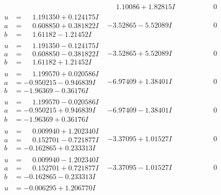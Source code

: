 \documentclass[1p]{elsarticle_modified}
\theoremstyle{definition}
\begin{document}
$$\begin{array}{c|c|c}
 & \phantom{-}1.10086 + 1.82815 I & \phantom{-0.000000 } 0 \\ \hline\begin{aligned}
u &= \phantom{-}1.191350 + 0.124175 I \\
a &= \phantom{-}0.608850 + 0.381822 I \\
b &= \phantom{-}1.61182 - 1.21452 I\end{aligned}
 & -3.52865 - 5.52089 I & \phantom{-0.000000 } 0 \\ \hline\begin{aligned}
u &= \phantom{-}1.191350 - 0.124175 I \\
a &= \phantom{-}0.608850 - 0.381822 I \\
b &= \phantom{-}1.61182 + 1.21452 I\end{aligned}
 & -3.52865 + 5.52089 I & \phantom{-0.000000 } 0 \\ \hline\begin{aligned}
u &= \phantom{-}1.199570 + 0.020586 I \\
a &= -0.950215 - 0.946839 I \\
b &= -1.96369 - 0.36176 I\end{aligned}
 & -6.97409 + 1.38401 I & \phantom{-0.000000 } 0 \\ \hline\begin{aligned}
u &= \phantom{-}1.199570 - 0.020586 I \\
a &= -0.950215 + 0.946839 I \\
b &= -1.96369 + 0.36176 I\end{aligned}
 & -6.97409 - 1.38401 I & \phantom{-0.000000 } 0 \\ \hline\begin{aligned}
u &= \phantom{-}0.009940 + 1.202340 I \\
a &= \phantom{-}0.152701 - 0.721877 I \\
b &= -0.162865 + 0.233313 I\end{aligned}
 & -3.37095 + 1.01527 I & \phantom{-0.000000 } 0 \\ \hline\begin{aligned}
u &= \phantom{-}0.009940 - 1.202340 I \\
a &= \phantom{-}0.152701 + 0.721877 I \\
b &= -0.162865 - 0.233313 I\end{aligned}
 & -3.37095 - 1.01527 I & \phantom{-0.000000 } 0 \\ \hline\begin{aligned}
u &= -0.006295 + 1.206770 I \\

\end{aligned}
\end{array}$$
\end{document}
